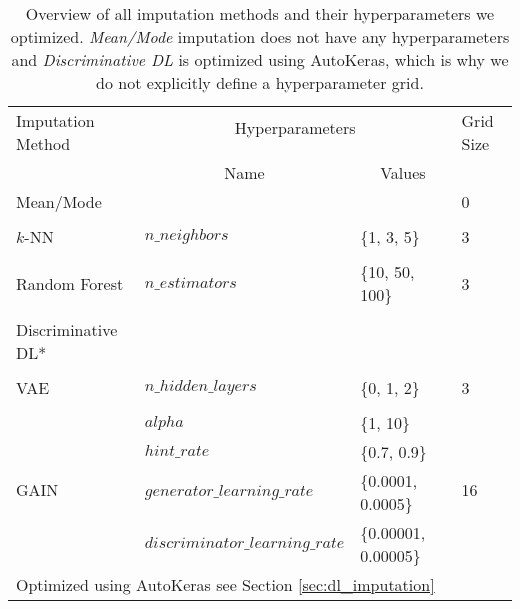 \begin{table}[]
	\centering
	\begin{tabular}{@{}llll@{}}
		\toprule
		\multirow{2}{*}{Imputation Method} & \multicolumn{2}{c}{Hyperparameters}                          & \multirow{2}{*}{Grid Size} \\\cline{2-3}
		\\[-0.75em]
		& \multicolumn{1}{c}{Name}        & \multicolumn{1}{c}{Values} &                            \\ \midrule
		Mean/Mode                         &                                 &                            & 0                          \\
		\\[-0.5em]
		$k$-NN                             & $n\_neighbors$                  & \{1, 3, 5\}                & 3                          \\
		\\[-0.5em]
		Random Forest                      & $n\_estimators$                 & \{10, 50, 100\}            & 3                          \\
		\\[-0.5em]
		Discriminative DL*                   &                                 &                            &                            \\
		\\[-0.5em]
		VAE                                & $n\_hidden\_layers$             & \{0, 1, 2\}                & 3                          \\
		\\[-0.5em]
		\multirow{4}{*}{GAIN}              & $alpha$                         & \{1, 10\}                  & \multirow{4}{*}{16}        \\
		& $hint\_rate$                    & \{0.7, 0.9\}               &                            \\
		& $generator\_learning\_rate$     & \{0.0001, 0.0005\}         &                            \\
		& $discriminator\_learning\_rate$ & \{0.00001, 0.00005\}       &                            \\ \bottomrule
		\multicolumn{4}{l}{\footnotesize*Optimized using AutoKeras see Section \ref{sec:dl_imputation}}
	\end{tabular}
	\caption{Overview of all imputation methods and their hyperparameters we optimized. \emph{Mean/Mode} imputation does not have any hyperparameters and \emph{Discriminative DL} is optimized using AutoKeras, which is why we do not explicitly define a hyperparameter grid.}
	\label{tab:HPO}
\end{table}



